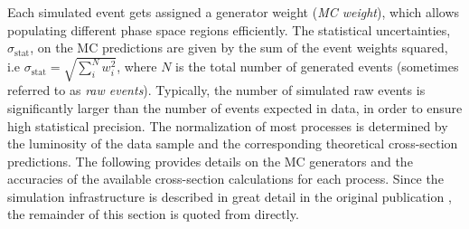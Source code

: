 Each simulated event gets assigned a generator weight (\emph{MC weight}), which allows populating different phase space regions efficiently.
The statistical uncertainties, $\sigma_\mathrm{stat}$, on the MC predictions are given by the sum of the event weights squared, i.e $\sigma_\mathrm{stat} = \sqrt{\sum_i^N w_i^2}$, where $N$ is the total number of generated events (sometimes referred to as \emph{raw events}). Typically, the number of simulated raw events is significantly larger than the number of events expected in data, in order to ensure high statistical precision.
The normalization of most processes is determined by the luminosity of the data sample and the corresponding theoretical cross-section predictions.
The following provides details on the MC generators and the accuracies of the available cross-section calculations for each process. 
Since the simulation infrastructure is described in great detail in the original publication \cite{HWWPaper}, the remainder of this section is quoted from  directly.
\FloatBarrier
